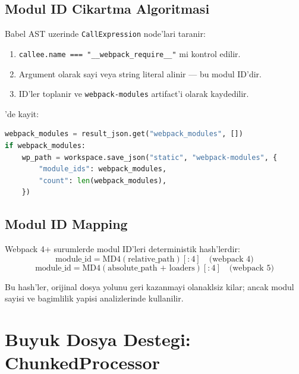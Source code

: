 \subsection{Modul ID Cikartma Algoritmasi}

Babel AST uzerinde \texttt{CallExpression} node'lari taranir:

\begin{enumerate}
\item \texttt{callee.name === "\_\_webpack\_require\_\_"} mi kontrol edilir.
\item Argument olarak sayi veya string literal alinir --- bu modul ID'dir.
\item ID'ler toplanir ve \texttt{webpack-modules} artifact'i olarak kaydedilir.
\end{enumerate}

'de kayit:
\begin{lstlisting}[language=Python, caption={Webpack modul kaydi}]
webpack_modules = result_json.get("webpack_modules", [])
if webpack_modules:
    wp_path = workspace.save_json("static", "webpack-modules", {
        "module_ids": webpack_modules,
        "count": len(webpack_modules),
    })
\end{lstlisting}

\subsection{Modul ID Mapping}

Webpack 4+ surumlerde modul ID'leri deterministik hash'lerdir:
\begin{equation}
\label{eq:webpack-id}
\text{module\_id} = \text{MD4}(\text{relative\_path})[:4] \quad \text{(webpack 4)}
\end{equation}
\begin{equation}
\label{eq:webpack5-id}
\text{module\_id} = \text{MD4}(\text{absolute\_path + loaders})[:4] \quad \text{(webpack 5)}
\end{equation}

Bu hash'ler, orijinal dosya yolunu geri kazanmayi olanaklsiz kilar; ancak modul sayisi ve bagimlilik yapisi analizlerinde kullanilir.


\section{Buyuk Dosya Destegi: ChunkedProcessor}
\label{sec:chunked-processor}

